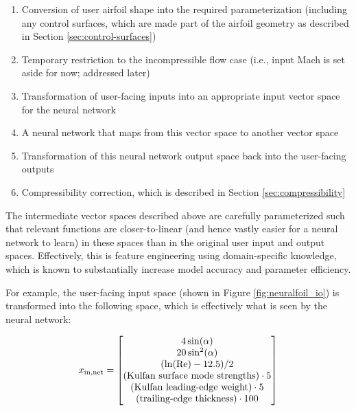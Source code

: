 \documentclass[conf]{new-aiaa}
\begin{document}
    \begin{enumerate}
        \item Conversion of user airfoil shape into the required parameterization (including any control surfaces, which are made part of the airfoil geometry as described in Section \ref{sec:control-surfaces})
        \item Temporary restriction to the incompressible flow case (i.e., input Mach is set aside for now; addressed later)
        \item Transformation of user-facing inputs into an appropriate input vector space for the neural network
        \item A neural network that maps from this vector space to another vector space
        \item Transformation of this neural network output space back into the user-facing outputs
        \item Compressibility correction, which is described in Section \ref{sec:compressibility}
    \end{enumerate}

    The intermediate vector spaces described above are carefully parameterized such that relevant functions are closer-to-linear (and hence vastly easier for a neural network to learn) in these spaces than in the original user input and output spaces. Effectively, this is feature engineering using domain-specific knowledge, which is known to substantially increase model accuracy and parameter efficiency.

    For example, the user-facing input space (shown in Figure \ref{fig:neuralfoil_io}) is transformed into the following space, which is effectively what is seen by the neural network:

    \begin{equation}
        x_{\rm in,net} = \begin{bmatrix}
                             4 \sin(\alpha)                                 \\
                             20 \sin^2(\alpha)    \\
                             (\ln(\rm Re) - 12.5) / 2 \\
                             (\text{Kulfan surface mode strengths}) \cdot 5             \\
                             (\text{Kulfan leading-edge weight}) \cdot 5    \\
                             (\text{trailing-edge thickness}) \cdot 100     \\
        \end{bmatrix}
    \end{equation}
\end{document}
